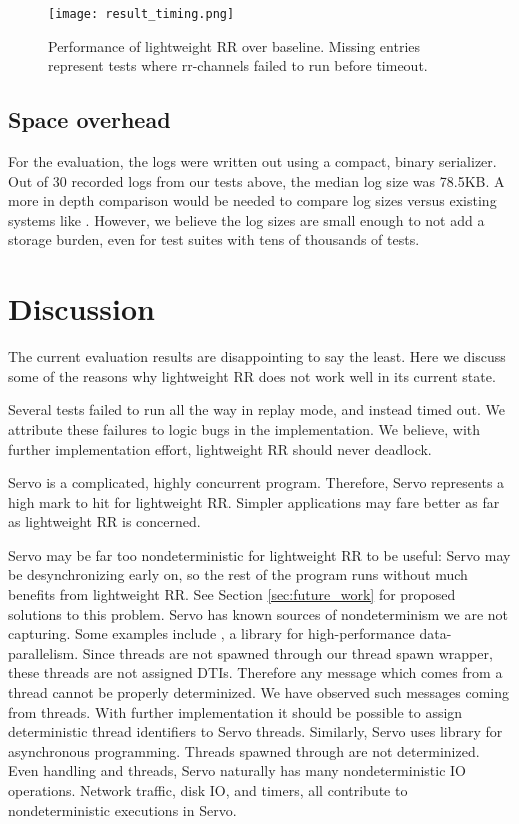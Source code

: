 \begin{figure}
  \texttt{[image: result\_timing.png]}
  \caption{Performance of lightweight RR over baseline. Missing entries represent
  tests where rr-channels failed to run before timeout.}
  \label{fig:result_timing}
\end{figure}

\subsection{Space overhead}
For the evaluation, the logs were written out using a compact, binary serializer.
Out of 30 recorded logs from our tests above, the median log size was 78.5KB.
A more in depth comparison would be needed to compare log sizes versus existing
systems like . However, we believe the log sizes are small enough to
not add a storage burden, even for test suites with tens of thousands of tests.

\section{Discussion}
\label{sec:discussion}
The current evaluation results are disappointing to say the least. Here we discuss
some of the reasons why lightweight RR does not work well in its current state.

Several tests failed to run all the way in replay mode, and instead timed out. We attribute
these failures to logic bugs in the implementation. We believe, with further implementation
effort, lightweight RR should never deadlock.

Servo is a complicated, highly concurrent program. Therefore, Servo represents a high
mark to hit for lightweight RR. Simpler applications may fare better as far as lightweight
RR is concerned.

Servo may be far too nondeterministic
for lightweight RR to be useful: Servo may be desynchronizing early on, so the rest of
the program runs without much benefits from lightweight RR.
See Section \ref{sec:future_work} for proposed solutions to this
problem. Servo has known sources of nondeterminism we are not capturing. Some examples
include , a library for high-performance data-parallelism. Since  threads are
not spawned through our thread spawn wrapper, these threads are not assigned DTIs. Therefore any message which comes from a  thread cannot be properly determinized.
We have observed such messages coming from  threads.
With further implementation it should be possible to assign deterministic thread
identifiers to Servo threads. Similarly, Servo uses  library for asynchronous programming. Threads spawned through  are not determinized.
Even handling  and  threads, Servo naturally has many nondeterministic IO operations. Network traffic, disk IO, and timers, all contribute to nondeterministic executions in Servo.


